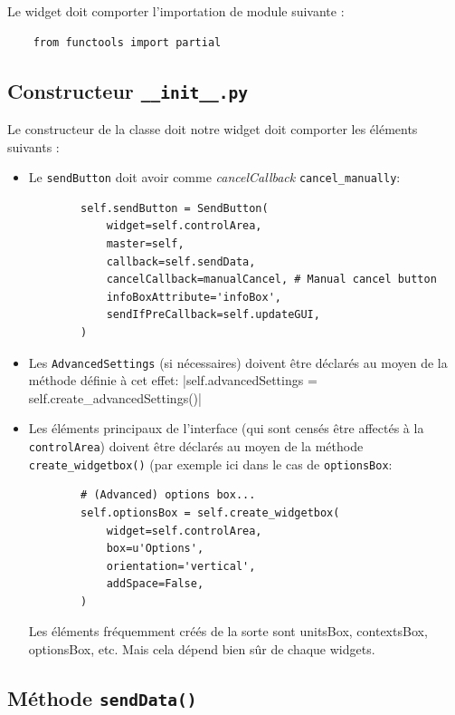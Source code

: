 \documentclass{article}
\begin{document}
{Le widget doit comporter l'importation de module suivante : 

\begin{verbatim}
    from functools import partial
\end{verbatim}

\subsection{Constructeur \texttt{\_\_init\_\_.py}}

Le constructeur de la classe doit notre widget doit comporter les éléments suivants : 

\begin{itemize}
    \item Le \texttt{sendButton} doit avoir comme \textit{cancelCallback} \texttt{cancel\_manually}:
    \begin{verbatim}
        self.sendButton = SendButton(
            widget=self.controlArea,
            master=self,
            callback=self.sendData,
            cancelCallback=manualCancel, # Manual cancel button
            infoBoxAttribute='infoBox',
            sendIfPreCallback=self.updateGUI,
        )
    \end{verbatim}
    \item Les \texttt{AdvancedSettings} (si nécessaires) doivent être déclarés au moyen de la méthode définie à cet effet:
    |self.advancedSettings = self.create\_advancedSettings()|
    \item Les éléments principaux de l'interface (qui sont censés être affectés à la \texttt{controlArea}) doivent être déclarés au moyen de la méthode \texttt{create\_widgetbox()} (par exemple ici dans le cas de \texttt{optionsBox}: 
    \begin{verbatim}
        # (Advanced) options box...
        self.optionsBox = self.create_widgetbox(
            widget=self.controlArea,
            box=u'Options',
            orientation='vertical',
            addSpace=False,
        )
    \end{verbatim}
    Les éléments fréquemment créés de la sorte sont unitsBox, contextsBox, optionsBox, etc. Mais cela dépend bien sûr de chaque widgets.
\end{itemize}

\subsection{Méthode \texttt{sendData()}}

}
\end{document}
